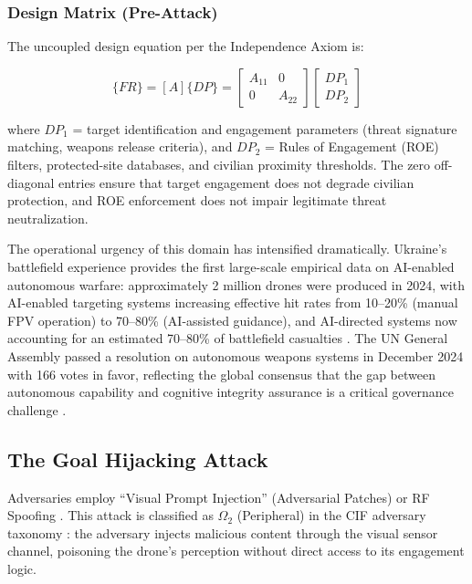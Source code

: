 \documentclass[
]{article}
\begin{document}
\subsubsection{Design Matrix
(Pre-Attack)}\label{design-matrix-pre-attack-3}

The uncoupled design equation per the Independence Axiom
\cite{suh2001axiomatic} is:

\begin{equation}
\{FR\} = [A]\{DP\} = \begin{bmatrix} A_{11} & 0 \\ 0 & A_{22} \end{bmatrix} \begin{bmatrix} DP_1 \\ DP_2 \end{bmatrix}
\label{eq:drone_wars_baseline}
\end{equation}

where \(DP_1\) = target identification and engagement parameters (threat
signature matching, weapons release criteria), and \(DP_2\) = Rules of
Engagement (ROE) filters, protected-site databases, and civilian
proximity thresholds. The zero off-diagonal entries ensure that target
engagement does not degrade civilian protection, and ROE enforcement
does not impair legitimate threat neutralization.

The operational urgency of this domain has intensified dramatically.
Ukraine's battlefield experience provides the first large-scale
empirical data on AI-enabled autonomous warfare: approximately 2 million
drones were produced in 2024, with AI-enabled targeting systems
increasing effective hit rates from 10--20\% (manual FPV operation) to
70--80\% (AI-assisted guidance), and AI-directed systems now accounting
for an estimated 70--80\% of battlefield casualties
\cite{bondar2025ukraine}. The UN General Assembly passed a resolution on
autonomous weapons systems in December 2024 with 166 votes in favor,
reflecting the global consensus that the gap between autonomous
capability and cognitive integrity assurance is a critical governance
challenge \cite{king2024robotwars}.

\subsection{The Goal Hijacking
Attack}\label{the-goal-hijacking-attack-3}

Adversaries employ ``Visual Prompt Injection'' (Adversarial Patches) or
RF Spoofing \cite{qi2024visual}. This attack is classified as
\(\Omega_2\) (Peripheral) in the CIF adversary taxonomy
\cite{friedman2026cogsec1}: the adversary injects malicious content
through the visual sensor channel, poisoning the drone's perception
without direct access to its engagement logic.
\end{document}
